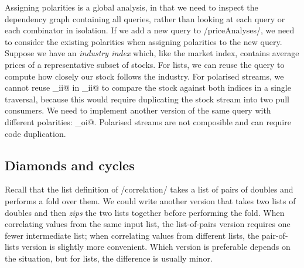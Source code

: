 Assigning polarities is a global analysis, in that we need to inspect the dependency graph containing all queries, rather than looking at each query or each combinator in isolation.
If we add a new query to \Hs/priceAnalyses/, we need to consider the existing polarities when assigning polarities to the new query.
Suppose we have an \emph{industry index} which, like the market index, contains average prices of a representative subset of stocks.
For lists, we can reuse the \Hs@priceOverMarket@ query to compute how closely our stock follows the industry.
For polarised streams, we cannot reuse \Hs@priceOverMarket_ii@ in \Hs@priceAnalyses_ii@ to compare the stock against both indices in a single traversal, because this would require duplicating the stock stream into two pull consumers.
We need to implement another version of the same query with different polarities: \Hs@priceOverMarket_oi@.
Polarised streams are not composible and can require code duplication.

\subsection{Diamonds and cycles}
\label{taxonomy/polarised/diamonds}

Recall that the list definition of \Hs/correlation/ takes a list of pairs of doubles and performs a fold over them.
We could write another version that takes two lists of doubles and then \emph{zips} the two lists together before performing the fold.
When correlating values from the same input list, the list-of-pairs version requires one fewer intermediate list; when correlating values from different lists, the pair-of-lists version is slightly more convenient.
Which version is preferable depends on the situation, but for lists, the difference is usually minor.



